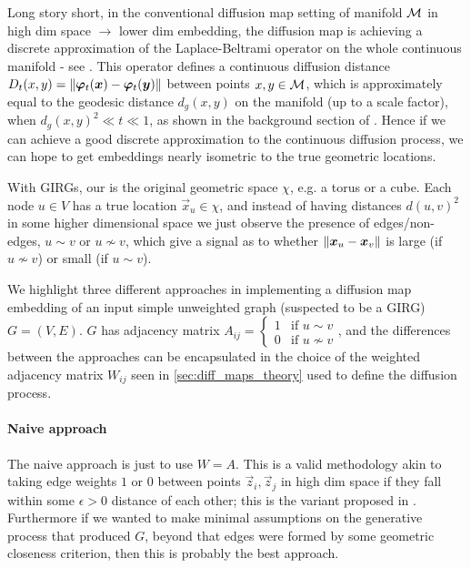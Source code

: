 

Long story short, in the conventional diffusion map setting of manifold $\mathcal{M}$ in high dim space $\to$ lower dim embedding, the diffusion map is achieving a discrete approximation of the Laplace-Beltrami operator on the whole continuous manifold - see \cite{singer2006graph}. This operator defines a continuous diffusion distance $D_t(x, y) = \left\lVert \bm{\varphi}_t(\bm{x}) - \bm{\varphi}_t(\bm{y})\right\rVert$ between points $x, y \in \mathcal{M}$, which is approximately equal to the geodesic distance $d_g(x, y)$ on the manifold (up to a scale factor), when $d_g(x, y)^2 \ll t \ll 1$, as shown in the background section of \cite{berry2018iterated}. Hence if we can achieve a good discrete approximation to the continuous diffusion process, we can hope to get embeddings nearly isometric to the true geometric locations.

With GIRGs, our  is the original geometric space $\chi$, e.g. a torus or a cube. Each node $u \in V$ has a true location $\vec{x}_u \in \chi$, and instead of having distances $d(u, v)^2$ in some higher dimensional space we just observe the presence of edges/non-edges, $u \sim v$ or $u \nsim v$, which give a signal as to whether $\left\lVert \bm{x}_u - \bm{x}_v\right\rVert$ is large (if $u \nsim v$) or small (if $u \sim v$).

We highlight three different approaches in implementing a diffusion map embedding of an input simple unweighted graph (suspected to be a GIRG) $G=(V, E)$.
$G$ has adjacency matrix $A_{ij} = \begin{cases} 1 & \text{if } u \sim v \\ 0 & \text{if } u \nsim v \end{cases}$, and the differences between the approaches can be encapsulated in the choice of the weighted adjacency matrix $W_{ij}$ seen in \cref{sec:diff_maps_theory} used to define the diffusion process.

\paragraph{Naive approach}
The naive approach is just to use $W = A$. This is a valid methodology akin to taking edge weights $1$ or $0$ between points $\vec{z}_i, \vec{z}_j$ in high dim space if they fall within some $\epsilon > 0$ distance of each other; this is the  variant proposed in \cite{belkin2001laplacian}. Furthermore if we wanted to make minimal assumptions on the generative process that produced $G$, beyond that edges were formed by some geometric closeness criterion, then this is probably the best approach.

